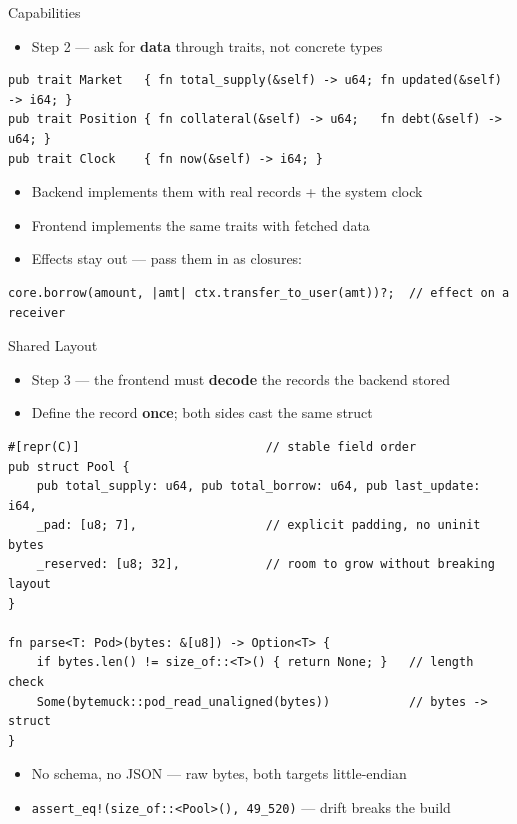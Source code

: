 \begin{frame}[fragile]{Capabilities}
  \begin{itemize}
    \item Step 2 --- ask for \textbf{data} through traits, not concrete types
  \end{itemize}
  \vspace{0.2cm}
  \pause
\begin{lstlisting}
pub trait Market   { fn total_supply(&self) -> u64; fn updated(&self) -> i64; }
pub trait Position { fn collateral(&self) -> u64;   fn debt(&self) -> u64; }
pub trait Clock    { fn now(&self) -> i64; }
\end{lstlisting}
  \vspace{0.1cm}
  \pause
  \begin{itemize}
    \item Backend implements them with real records + the system clock
    \pause
    \item Frontend implements the same traits with fetched data
    \pause
    \item Effects stay out --- pass them in as closures:
  \end{itemize}
  \pause
\begin{lstlisting}
core.borrow(amount, |amt| ctx.transfer_to_user(amt))?;  // effect on a receiver
\end{lstlisting}
\end{frame}

\begin{frame}[fragile]{Shared Layout}
  \begin{itemize}
    \item Step 3 --- the frontend must \textbf{decode} the records the backend stored
    \pause
    \item Define the record \textbf{once}; both sides cast the same struct
  \end{itemize}
  \pause
\begin{lstlisting}
#[repr(C)]                          // stable field order
pub struct Pool {
    pub total_supply: u64, pub total_borrow: u64, pub last_update: i64,
    _pad: [u8; 7],                  // explicit padding, no uninit bytes
    _reserved: [u8; 32],            // room to grow without breaking layout
}

fn parse<T: Pod>(bytes: &[u8]) -> Option<T> {
    if bytes.len() != size_of::<T>() { return None; }   // length check
    Some(bytemuck::pod_read_unaligned(bytes))           // bytes -> struct
}
\end{lstlisting}
  \pause
  \begin{itemize}
    \item No schema, no JSON --- raw bytes, both targets little-endian
    \pause
    \item \texttt{assert\_eq!(size\_of::<Pool>(), 49\_520)} --- drift breaks the build
  \end{itemize}
\end{frame}

